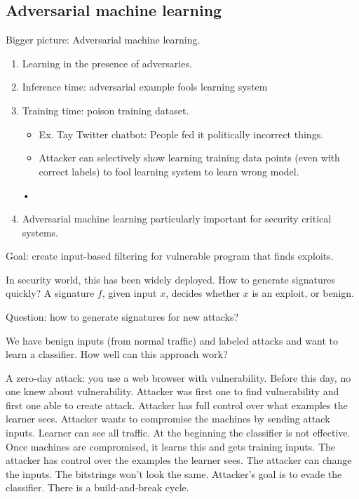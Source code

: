 \subsection{Adversarial machine learning}
Bigger picture:
Adversarial machine learning.
\begin{enumerate}
\item
Learning in the presence of adversaries.
\item
Inference time: adversarial example fools learning system
\item
Training time: poison training dataset.
\begin{itemize}
\item
Ex. Tay Twitter chatbot: People fed it politically incorrect things. 
\item
Attacker can selectively show learning training data points (even with correct labels) to fool learning system to learn wrong model.
\end{itemize}•
\item
Adversarial machine learning particularly important for security critical systems.
\end{enumerate}

Goal: create input-based filtering for vulnerable program that finds exploits.

In security world, this has been widely deployed. How to generate signatures quickly? A signature $f$, given input $x$, decides whether $x$ is an exploit, or benign.


Question: how to generate signatures for new attacks?

We have benign inputs (from normal traffic) and labeled attacks and want to learn a classifier. How well can this approach work?

A zero-day attack: you use a web browser with vulnerability. Before this day, no one knew about vulnerability. Attacker was first one to find vulnerability and first one able to create attack. Attacker has full control over what examples the learner sees.
Attacker wants to compromise the machines by sending attack inputs. Learner can see all traffic. At the beginning the classifier is not effective. Once machines are compromised, it learns this and gets training inputs. The attacker has control over the examples the learner sees. The attacker can change the inputs. The bitstrings won't look the same. Attacker's goal is to evade the classifier.  There is a build-and-break cycle. 

